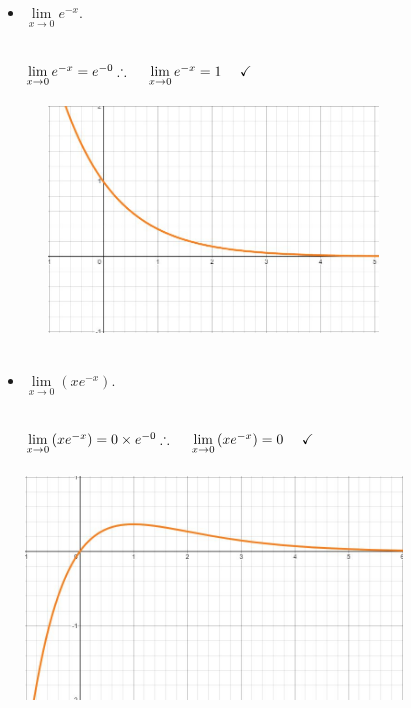 \documentclass[fleqn]{article}
\begin{document}
\begin{enumerate}
\begin{itemize}
      \item $\lim\limits_{x \to 0} e^{-x}$. 

        \textcolor{hwColor}{
          \\
          $
            \lim\limits_{x \to 0} e^{-x}=e^{-0}
            \\
            \\
            \\
            \therefore ~~~~ \lim\limits_{x \to 0} e^{-x}=1 ~~~~ \checkmark
            \\
          $
          \\
          \\
          \includegraphics[width=10cm, height=6cm]{Nine.JPG}
          \\
          \\
        }

      \item $\lim\limits_{x \to 0} \left(x e^{-x}\right)$.

        \textcolor{hwColor}{
          \\
          $
            \lim\limits_{x \to 0} \left(x e^{-x}\right)=0 \times e^{-0}
            \\
            \\
            \\
            \therefore ~~~~ \lim\limits_{x \to 0} \left(x e^{-x}\right)=0  ~~~~ \checkmark
            \\
          $
          \\
          \\
          \includegraphics[width=10cm, height=6cm]{Eight.JPG}
          \\
          \\
        }
      

\end{itemize}
\end{enumerate}
\end{document}
